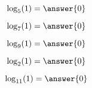 \documentclass{ximera}
\author{Lee Wayand}
\begin{document}
\begin{example}











\[
\log_5(1) = \answer{0}
\]






\[
\log_7(1) = \answer{0}
\]






\[
\log_9(1) = \answer{0}
\]






\[
\log_2(1) = \answer{0}
\]






\[
\log_{11}(1) = \answer{0}
\]






\end{example}
\end{document}
